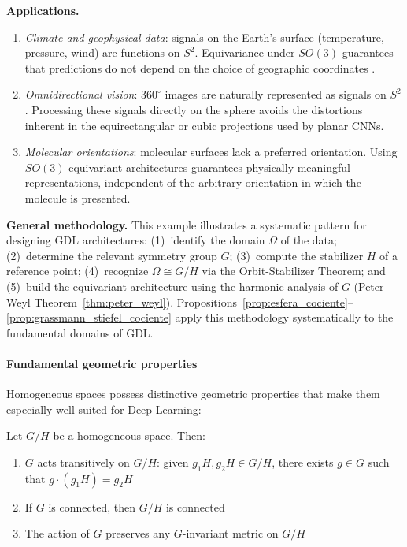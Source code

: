 \begin{example}
\textbf{Applications.}
\begin{enumerate}
    \item \emph{Climate and geophysical data}: signals on the Earth's surface (temperature, pressure, wind) are functions on $S^2$. Equivariance under $SO(3)$ guarantees that predictions do not depend on the choice of geographic coordinates \citep{cohen2018sphericalcnns}.

    \item \emph{Omnidirectional vision}: $360^\circ$ images are naturally represented as signals on $S^2$. Processing these signals directly on the sphere avoids the distortions inherent in the equirectangular or cubic projections used by planar \glspl{CNN}.

    \item \emph{Molecular orientations}: molecular surfaces lack a preferred orientation. Using $SO(3)$-equivariant architectures guarantees physically meaningful representations, independent of the arbitrary orientation in which the molecule is presented.
\end{enumerate}

\textbf{General methodology.}
This example illustrates a systematic pattern for designing \gls{GDL} architectures: (1)~identify the domain $\Omega$ of the data; (2)~determine the relevant symmetry group $G$; (3)~compute the stabilizer $H$ of a reference point; (4)~recognize $\Omega \cong G/H$ via the Orbit-Stabilizer Theorem; and (5)~build the equivariant architecture using the harmonic analysis of $G$ (Peter-Weyl Theorem~\ref{thm:peter_weyl}). Propositions~\ref{prop:esfera_cociente}--\ref{prop:grassmann_stiefel_cociente} apply this methodology systematically to the fundamental domains of \gls{GDL}.
\end{example}

\paragraph{Fundamental geometric properties}

Homogeneous spaces possess distinctive geometric properties that make them especially well suited for Deep Learning:

\begin{proposition}\label{prop:transitividad_espacios_homogeneos}
Let $G/H$ be a homogeneous space. Then:
\begin{enumerate}
    \item $G$ acts transitively on $G/H$: given $g_1H, g_2H \in G/H$, there exists $g \in G$ such that $g \cdot (g_1H) = g_2H$
    \item If $G$ is connected, then $G/H$ is connected
    \item The action of $G$ preserves any $G$-invariant metric on $G/H$
\end{enumerate}
\end{proposition}

